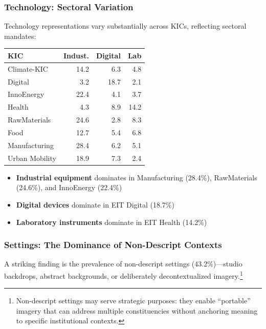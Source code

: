 \documentclass[../main.tex]{subfiles}
\begin{document}
\subsubsection{Technology: Sectoral Variation}

Technology representations vary substantially across KICs, reflecting sectoral mandates:
\begin{margintable}
\centering
\small
\begin{tabular}{lrrr}
\toprule
\textbf{KIC} & \textbf{Indust.} & \textbf{Digital} & \textbf{Lab} \\
\midrule
Climate-KIC & 14.2 & 6.3 & 4.8 \\
Digital & 3.2 & 18.7 & 2.1 \\
InnoEnergy & 22.4 & 4.1 & 3.7 \\
Health & 4.3 & 8.9 & 14.2 \\
RawMaterials & 24.6 & 2.8 & 8.3 \\
Food & 12.7 & 5.4 & 6.8 \\
Manufacturing & 28.4 & 6.2 & 5.1 \\
Urban Mobility & 18.9 & 7.3 & 2.4 \\
\bottomrule
\end{tabular}
\caption{Technology type by KIC (\%)}
\end{margintable}

\begin{itemize}
    \item \textbf{Industrial equipment} dominates in Manufacturing (28.4\%), RawMaterials (24.6\%), and InnoEnergy (22.4\%)
    \item \textbf{Digital devices} dominate in EIT Digital (18.7\%)
    \item \textbf{Laboratory instruments} dominate in EIT Health (14.2\%)
\end{itemize}

\subsubsection{Settings: The Dominance of Non-Descript Contexts}

A striking finding is the prevalence of non-descript settings (43.2\%)---studio backdrops, abstract backgrounds, or deliberately decontextualized imagery.\footnote{Non-descript settings may serve strategic purposes: they enable ``portable'' imagery that can address multiple constituencies without anchoring meaning to specific institutional contexts.}
\end{document}

